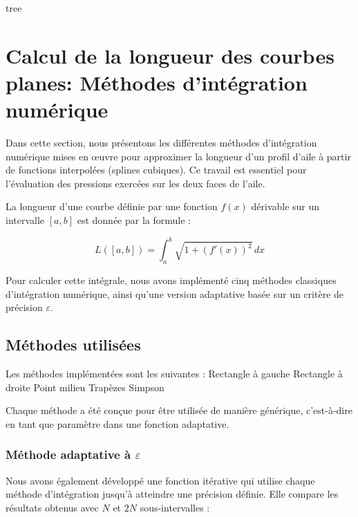 tree\section{Calcul de la longueur des courbes planes: Méthodes d'intégration numérique}
\label{sec:curves}

Dans cette section, nous présentons les différentes méthodes d’intégration numérique mises en œuvre pour approximer la longueur d’un profil d’aile à partir de fonctions interpolées (splines cubiques). Ce travail est essentiel pour l’évaluation des pressions exercées sur les deux faces de l’aile.

La longueur d'une courbe définie par une fonction $f(x)$ dérivable sur un intervalle $[a, b]$ est donnée par la formule :

\[
L([a, b]) = \int_a^b \sqrt{1 + (f'(x))^2} \, dx
\]

Pour calculer cette intégrale, nous avons implémenté cinq méthodes classiques d’intégration numérique, ainsi qu'une version adaptative basée sur un critère de précision $\varepsilon$.

\subsection{Méthodes utilisées}

Les méthodes implémentées sont les suivantes :  Rectangle à gauche
 Rectangle à droite
 Point milieu
 Trapèzes
Simpson


Chaque méthode a été conçue pour être utilisée de manière générique, c’est-à-dire en tant que paramètre dans une fonction adaptative.

\subsubsection*{Méthode adaptative à $\varepsilon$}

Nous avons également développé une fonction itérative qui utilise chaque méthode d'intégration jusqu'à atteindre une précision définie. Elle compare les résultats obtenus avec $N$ et $2N$ sous-intervalles :

